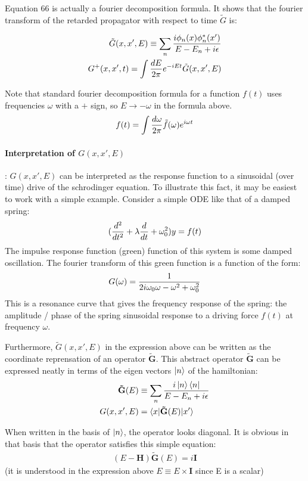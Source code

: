 \documentclass[11pt]{article}
\theoremstyle{definition}
\begin{document}
Equation 66 is actually a fourier decomposition formula.  It shows that the fourier transform of the retarded propagator with respect to time $\tilde{G}$ is:

\begin{align}
\tilde{G}(x, x', E) \equiv \sum_n {i \phi_n(x) \phi_n^*(x') \over E - E_n + i \epsilon} \\
G^+(x, x', t) = \int {dE \over 2 \pi} e^{-i E t} \tilde{G}(x, x', E) 
\end{align}

Note that standard fourier decomposition formula for a function $f(t)$ uses frequencies $\omega$ with a $+$ sign, so $E \rightarrow -\omega$ in the formula above.
$$ f(t) = \int {d \omega \over 2 \pi} \tilde{f}(\omega) e^{i \omega t}$$

\paragraph{Interpretation of $G(x, x', E)$}:
$G(x, x', E)$ can be interpreted as the response function to a sinusoidal (over time) drive of the schrodinger equation.  To illustrate this fact, it may be easiest to work with a simple example.  Consider a simple ODE like that of a damped spring: $$({d^2 \over dt^2} + \lambda {d \over dt} +  \omega_0^2) y = f(t)$$
The impulse response function (green) function of this system is some damped oscillation. The fourier transform of this green function is a function of the form:
$$G(\omega) = {1 \over 2 i \omega_0 \omega - \omega^2 + \omega_0^2}$$
This is a resonance curve that gives the frequency response of the spring: the amplitude / phase of the spring sinusoidal response to a driving force $f(t)$ at frequency $\omega$.

Furthermore, $\tilde{G}(x, x', E)$ in the expression above can be written as the coordinate reprensation of an operator $\mathbf{\tilde{G}}$.
This abstract operator $\mathbf{\tilde{G}}$ can be expressed neatly in terms of the eigen vectors $\ket{n}$ of the hamiltonian:
\begin{align}
\mathbf{\tilde{G}}(E) &\equiv \sum_{n} {i \ket{n} \bra{n} \over E - E_n + i \epsilon} \\
G(x, x', E) &= \braket{x| \mathbf{\tilde{G}}(E)| x'}
\end{align}

When written in the basis of $\ket{n}$, the operator looks diagonal.  It is obvious in that basis that the operator satisfies this simple equation:
\begin{align}
(E - \mathbf{H}) \mathbf{\tilde{G}}(E) =i \mathbf{I}
\end{align}
(it is understood in the expression above $E \equiv E \times \mathbf{I}$ since E is a scalar)
\end{document}
